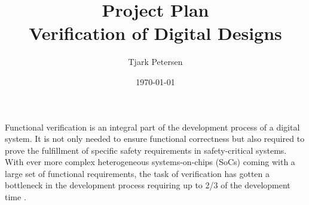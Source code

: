 \documentclass[11pt]{article}
\begin{document}
\title{{\Huge Project Plan}\\ Verification of Digital Designs}
\author{Tjark Petersen}
\date{\today}

\maketitle


\begin{comment}
- verification important -> not only for functional correctness, but required for safety-critical systems
- in the critical path of the development process \cite{bergeron2012writing}
- consumes more than 2/3 of the development time \cite{bergeron2012writing}
- dedicated verification engineers
- intricate process, not any more just writing a testbench with some directed test cases
- complex environments, complex SoCs, random stimulus, coverage-driven verification, formal verification, etc.
- abstraction can help to manage complexity \cite{bergeron2012writing}
- but we have balance control and abstraction \cite{bergeron2012writing}



- HVLs were introduced to abstract and ease testbench development
- intially co-simulation based like Vera added crv, OOP, etc.
- today SV merged SuperLog and Vera -> single language

- SV alone provides primitives for creation of best practice test environments
- but no guidlines of how to do so -> no reuse
- UVM introduces framework for creation of sophisticated testbenches in SV which encourage reuse by providing guidelines and class hierarchies \cite{flake2020a}
- standard from 2017




- "all verification projects present a recurring set of challenges; hence, valuable time and effort are saved by reusing code common to all environments. This is achieved with a software library that provides verification facilities such as error reporting and communications handshaking" \cite{flake2020a}


\end{comment}

Functional verification is an integral part of the development process of a digital system. It is not only needed to ensure functional correctness but also required to prove the fulfillment of specific safety requirements in safety-critical systems. 
With ever more complex heterogeneous systems-on-chips (SoCs) coming with a large set of functional requirements, the task of verification has gotten a bottleneck in the development process requiring up to 2/3 of the development time \cite{bergeron2012writing}.
\end{document}
